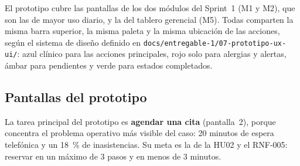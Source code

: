 \documentclass[11pt,a4paper]{article}
\begin{document}
El prototipo cubre las pantallas de los dos módulos del Sprint~1 (M1 y M2), que son las de mayor
uso diario, y la del tablero gerencial (M5). Todas comparten la misma barra superior, la misma
paleta y la misma ubicación de las acciones, según el sistema de diseño definido en
\nolinkurl{docs/entregable-1/07-prototipo-ux-ui/}: azul clínico para las acciones principales,
rojo solo para alergias y alertas, ámbar para pendientes y verde para estados completados.

\subsection{Pantallas del prototipo}

La tarea principal del prototipo es \textbf{agendar una cita} (pantalla~2), porque concentra el
problema operativo más visible del caso: 20 minutos de espera telefónica y un 18~\% de
inasistencias. Su meta es la de la HU02 y el RNF-005: reservar en un máximo de 3 pasos y en
menos de 3 minutos.
\end{document}
